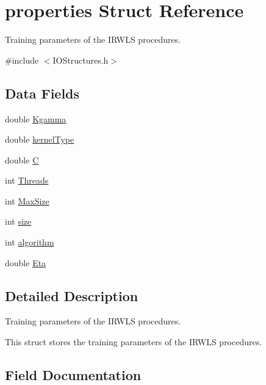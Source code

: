 \hypertarget{structproperties}{}\section{properties Struct Reference}
\label{structproperties}


Training parameters of the I\+R\+W\+LS procedures.  




{\ttfamily \#include $<$I\+O\+Structures.\+h$>$}

\subsection*{Data Fields}
\begin{DoxyCompactItemize}
\item 
double \hyperlink{structproperties_aab9c0195a446f08fc782701750ddb6ac}{Kgamma}
\item 
double \hyperlink{structproperties_a498e1588ce31c3265632f17f7d65c624}{kernel\+Type}
\item 
double \hyperlink{structproperties_a3b98814395b295db30f029e5e67ae9c9}{C}
\item 
int \hyperlink{structproperties_a56ab77c44fb808e71990074bd75529ed}{Threads}
\item 
int \hyperlink{structproperties_a42219768dd35e1ab628e1785759df400}{Max\+Size}
\item 
int \hyperlink{structproperties_a1694aebbbdd904f9b0e5faca725966b6}{size}
\item 
int \hyperlink{structproperties_aa0ba665a115d2e69811c694bc1af5096}{algorithm}
\item 
double \hyperlink{structproperties_abd91deb543a31a6a1f75892af7cf95c8}{Eta}
\end{DoxyCompactItemize}


\subsection{Detailed Description}
Training parameters of the I\+R\+W\+LS procedures. 

This struct stores the training parameters of the I\+R\+W\+LS procedures. 

\subsection{Field Documentation}
\hypertarget{structproperties_aa0ba665a115d2e69811c694bc1af5096}{}\label{structproperties_aa0ba665a115d2e69811c694bc1af5096} 
